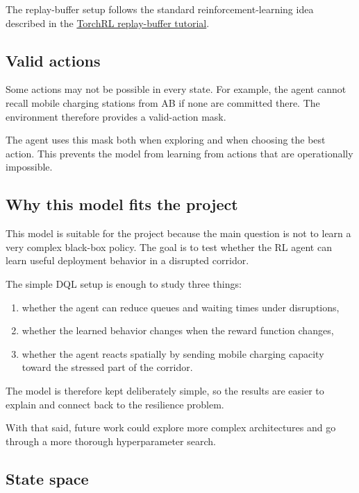 \documentclass[11pt]{article}
\providecommand{\tightlist}{%
      \setlength{\itemsep}{0pt}\setlength{\parskip}{0pt}}
\begin{document}
The replay-buffer setup follows the standard reinforcement-learning idea
described in the
\href{https://docs.pytorch.org/rl/0.4/tutorials/rb_tutorial.html}{TorchRL
replay-buffer tutorial}.

\subsection{Valid actions}\label{valid-actions}

Some actions may not be possible in every state. For example, the agent
cannot recall mobile charging stations from AB if none are committed
there. The environment therefore provides a valid-action mask.

The agent uses this mask both when exploring and when choosing the best
action. This prevents the model from learning from actions that are
operationally impossible.

\subsection{Why this model fits the
project}\label{why-this-model-fits-the-project}

This model is suitable for the project because the main question is not
to learn a very complex black-box policy. The goal is to test whether
the RL agent can learn useful deployment behavior in a disrupted
corridor.

The simple DQL setup is enough to study three things:

\begin{enumerate}
\def\labelenumi{\arabic{enumi}.}
\tightlist
\item
  whether the agent can reduce queues and waiting times under
  disruptions,
\item
  whether the learned behavior changes when the reward function changes,
\item
  whether the agent reacts spatially by sending mobile charging capacity
  toward the stressed part of the corridor.
\end{enumerate}

The model is therefore kept deliberately simple, so the results are
easier to explain and connect back to the resilience problem.

With that said, future work could explore more complex architectures and
go through a more thorough hyperparameter search.

    \subsection{State space}\label{state-space}
\end{document}
